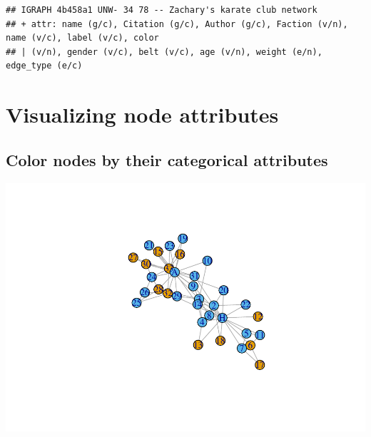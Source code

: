 \documentclass[
]{book}
\newenvironment{Shaded}{\begin{snugshade}}{\end{snugshade}}
\newcommand{\AttributeTok}[1]{\textcolor[rgb]{0.13,0.29,0.53}{#1}}
\newcommand{\CommentTok}[1]{\textcolor[rgb]{0.56,0.35,0.01}{\textit{#1}}}
\newcommand{\FunctionTok}[1]{\textcolor[rgb]{0.13,0.29,0.53}{\textbf{#1}}}
\newcommand{\NormalTok}[1]{#1}
\newcommand{\SpecialCharTok}[1]{\textcolor[rgb]{0.81,0.36,0.00}{\textbf{#1}}}
\begin{document}
\begin{verbatim}
## IGRAPH 4b458a1 UNW- 34 78 -- Zachary's karate club network
## + attr: name (g/c), Citation (g/c), Author (g/c), Faction (v/n), name (v/c), label (v/c), color
## | (v/n), gender (v/c), belt (v/c), age (v/n), weight (e/n), edge_type (e/c)
\end{verbatim}

\section{Visualizing node attributes}\label{visualizing-node-attributes}

\subsection{Color nodes by their categorical attributes}\label{color-nodes-by-their-categorical-attributes}

\begin{Shaded}
\end{Shaded}

\includegraphics{bookdown-demo_files/figure-latex/unnamed-chunk-126-1.pdf}

\begin{Shaded}
\end{Shaded}
\end{document}
